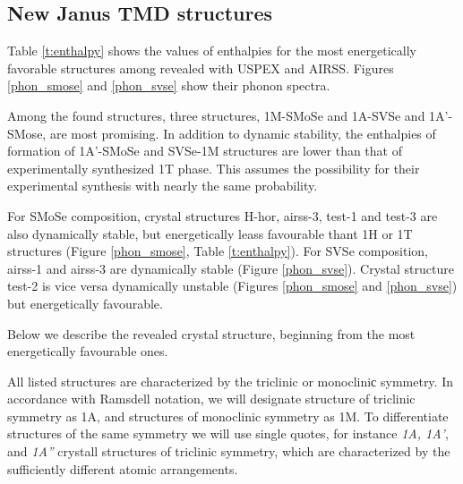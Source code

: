 \documentclass[a4paperm]{article}
\begin{document}
		\subsection{New Janus TMD structures}

Table \ref{t:enthalpy} shows the values of enthalpies for the most energetically favorable structures among revealed with USPEX and AIRSS.
 Figures \ref{phon_smose} and  \ref{phon_svse} show their phonon spectra. 
 
Among the found structures, three structures, 1M-SMoSe and 1A-SVSe and 1A'-SMose, are most promising.
In addition to dynamic stability, the enthalpies of formation of 1A'-SMoSe and SVSe-1M structures are lower than that of experimentally synthesized 1T phase.
This assumes the possibility for their experimental synthesis with nearly the same probability.

For SMoSe composition, crystal structures H-hor, airss-3, test-1 and test-3 are also dynamically stable, but energetically leass favourable thant 1H or 1T structures (Figure \ref{phon_smose}, Table \ref{t:enthalpy}).
For SVSe composition, airss-1 and airss-3 are dynamically stable (Figure \ref{phon_svse}).
Crystal structure test-2 is vice versa dynamically unstable (Figures \ref{phon_smose} and \ref{phon_svse}) but energetically favourable. 

Below we describe the revealed crystal structure, beginning from the most energetically favourable ones.

All listed structures are characterized by the triclinic or monocliniс symmetry.
In accordance with Ramsdell notation, we will designate structure of triclinic symmetry as 1A, and structures of monoclinic symmetry as 1M.
To differentiate structures of the same symmetry we will use single quotes, for instance {\it 1A, 1A'}, and {\it 1A''} crystall structures of triclinic symmetry, which are characterized by the sufficiently different atomic arrangements.
\end{document}
